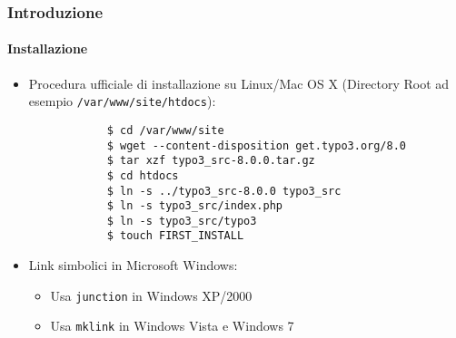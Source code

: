 \begin{frame}[fragile]
	\frametitle{Introduzione}
	\framesubtitle{Installazione}

	\begin{itemize}
		\item Procedura ufficiale di installazione su Linux/Mac OS X\newline
			(Directory Root ad esempio \texttt{/var/www/site/htdocs}):
		\begin{lstlisting}
			$ cd /var/www/site
			$ wget --content-disposition get.typo3.org/8.0
			$ tar xzf typo3_src-8.0.0.tar.gz
			$ cd htdocs
			$ ln -s ../typo3_src-8.0.0 typo3_src
			$ ln -s typo3_src/index.php
			$ ln -s typo3_src/typo3
			$ touch FIRST_INSTALL
		\end{lstlisting}

		\item Link simbolici in Microsoft Windows:

			\begin{itemize}
				\item Usa \texttt{junction} in Windows XP/2000
				\item Usa \texttt{mklink} in Windows Vista e Windows 7
			\end{itemize}

	\end{itemize}
\end{frame}


